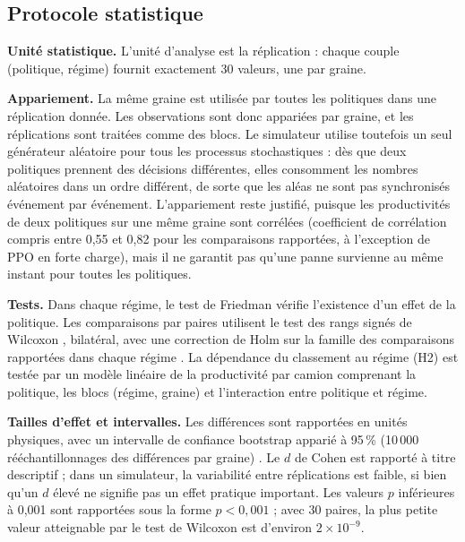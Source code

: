 \documentclass[11pt,a4paper]{article}
\newif\ifrevmarks
\newcommand{\revtag}[1]{\ifrevmarks\textsuperscript{\textcolor{red!70!black}{\scriptsize[#1]}}\fi}
\newenvironment{revbloc}[1]{\par\ifrevmarks\color{revcolor}\noindent\revtag{#1}\ \fi}{\par}
\begin{document}
\subsection{Protocole statistique}
\label{sec:proto}

\begin{revbloc}{M3, M4, M5, M6, M22}
\textbf{Unité statistique.} L'unité d'analyse est la réplication : chaque couple (politique, régime) fournit exactement 30 valeurs, une par graine.

\textbf{Appariement.} La même graine est utilisée par toutes les politiques dans une réplication donnée. Les observations sont donc appariées par graine, et les réplications sont traitées comme des blocs. Le simulateur utilise toutefois un seul générateur aléatoire pour tous les processus stochastiques : dès que deux politiques prennent des décisions différentes, elles consomment les nombres aléatoires dans un ordre différent, de sorte que les aléas ne sont pas synchronisés événement par événement. L'appariement reste justifié, puisque les productivités de deux politiques sur une même graine sont corrélées (coefficient de corrélation compris entre 0,55 et 0,82 pour les comparaisons rapportées, à l'exception de PPO en forte charge), mais il ne garantit pas qu'une panne survienne au même instant pour toutes les politiques.

\textbf{Tests.} Dans chaque régime, le test de Friedman \cite{Friedman1937} vérifie l'existence d'un effet de la politique. Les comparaisons par paires utilisent le test des rangs signés de Wilcoxon \cite{Wilcoxon1945}, bilatéral, avec une correction de Holm \cite{Holm1979} sur la famille des comparaisons rapportées dans chaque régime \cite{Demsar2006}. La dépendance du classement au régime (H2) est testée par un modèle linéaire de la productivité par camion comprenant la politique, les blocs (régime, graine) et l'interaction entre politique et régime.

\textbf{Tailles d'effet et intervalles.} Les différences sont rapportées en unités physiques, avec un intervalle de confiance bootstrap apparié à 95\,\% (10\,000 rééchantillonnages des différences par graine) \cite{EfronTibshirani1993}. Le $d$ de Cohen est rapporté à titre descriptif ; dans un simulateur, la variabilité entre réplications est faible, si bien qu'un $d$ élevé ne signifie pas un effet pratique important. Les valeurs $p$ inférieures à 0,001 sont rapportées sous la forme $p<0{,}001$ ; avec 30 paires, la plus petite valeur atteignable par le test de Wilcoxon est d'environ $2\times10^{-9}$.
\end{revbloc}
\end{document}
